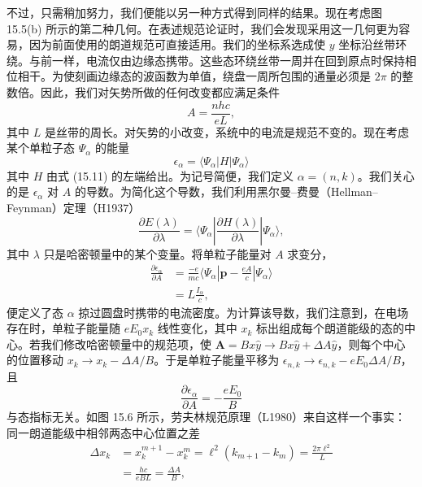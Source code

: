 不过，只需稍加努力，我们便能以另一种方式得到同样的结果。现在考虑图 15.5(b) 所示的第二种几何。在表述规范论证时，我们会发现采用这一几何更为容易，因为前面使用的朗道规范可直接适用。我们的坐标系选成使 $y$ 坐标沿丝带环绕。与前一样，电流仅由边缘态携带。这些态环绕丝带一周并在回到原点时保持相位相干。为使刻画边缘态的波函数为单值，绕盘一周所包围的通量必须是 $2\pi$ 的整数倍。因此，我们对矢势所做的任何改变都应满足条件
\begin{equation*}
A=\frac{nhc}{eL},\tag{15.26}
\end{equation*}
其中 $L$ 是丝带的周长。对矢势的小改变，系统中的电流是规范不变的。现在考虑某个单粒子态 $\Psi_{\alpha}$ 的能量
\begin{equation*}
\epsilon_{\alpha}=\langle\Psi_{\alpha}|H|\Psi_{\alpha}\rangle\tag{15.27}
\end{equation*}
其中 $H$ 由式 (15.11) 的左端给出。为记号简便，我们定义 $\alpha=(n,k)$。我们关心的是 $\epsilon_{\alpha}$ 对 $A$ 的导数。为简化这个导数，我们利用黑尔曼--费曼（Hellman--Feynman）定理（H1937）
\begin{equation*}
\frac{\partial E(\lambda)}{\partial\lambda}=\langle\Psi_{\alpha}|\frac{\partial H(\lambda)}{\partial\lambda}|\Psi_{\alpha}\rangle,\tag{15.28}
\end{equation*}
其中 $\lambda$ 只是哈密顿量中的某个变量。将单粒子能量对 $A$ 求变分，
\begin{align*}
\frac{\partial\epsilon_{\alpha}}{\partial A}&=\frac{-e}{mc}\langle\Psi_{\alpha}|\mathbf{p}-\frac{eA}{c}|\Psi_{\alpha}\rangle\\
&=L\frac{I_{\alpha}}{c},\tag{15.29}
\end{align*}
便定义了态 $\alpha$ 掠过圆盘时携带的电流密度。为计算该导数，我们注意到，在电场存在时，单粒子能量随 $eE_{0}x_{k}$ 线性变化，其中 $x_{k}$ 标出组成每个朗道能级的态的中心。若我们修改哈密顿量中的规范项，使 $\mathbf{A}=Bx\widehat{y}\rightarrow Bx\widehat{y}+\Delta A\widehat{y}$，则每个中心的位置移动 $x_{k}\rightarrow x_{k}-\Delta A/B$。于是单粒子能量平移为 $\epsilon_{n,k}\rightarrow\epsilon_{n,k}-eE_{0}\Delta A/B$，且
\begin{equation*}
\frac{\partial\epsilon_{\alpha}}{\partial A}=-\frac{eE_{0}}{B}\tag{15.30}
\end{equation*}
与态指标无关。如图 15.6 所示，劳夫林规范原理（L1980）来自这样一个事实：同一朗道能级中相邻两态中心位置之差
\begin{align*}
\Delta x_{k}&=x_{k}^{m+1}-x_{k}^{m}=\ell^{2}(k_{m+1}-k_{m})=\frac{2\pi\ell^{2}}{L}\\
&=\frac{hc}{eBL}=\frac{\Delta A}{B},\tag{15.31}
\end{align*}
